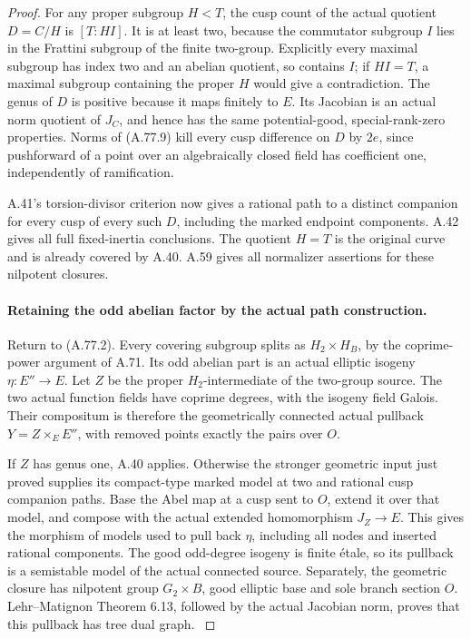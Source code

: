 \begin{proof}
For any proper subgroup \(H<T\), the cusp count of
the actual quotient \(D=C/H\) is \([T:HI]\).
It is at least two, because the commutator subgroup
\(I\) lies in the Frattini subgroup of the finite
two-group. Explicitly every maximal subgroup has index
two and an abelian quotient, so contains \(I\);
if \(HI=T\), a maximal subgroup containing the
proper \(H\) would give a contradiction. The genus
of \(D\) is positive because it maps finitely to
\(E\). Its Jacobian is an actual norm quotient of
\(J_C\), and hence has the same potential-good,
special-rank-zero properties. Norms of (A.77.9) kill
every cusp difference on \(D\) by \(2e\), since
pushforward of a point over an algebraically closed
field has coefficient one, independently of ramification.

A.41's torsion-divisor criterion now gives a rational
path to a distinct companion for every cusp of every
such \(D\), including the marked endpoint components.
A.42 gives all full fixed-inertia conclusions. The
quotient \(H=T\) is the original curve and is already
covered by A.40. A.59 gives all normalizer assertions
for these nilpotent closures.

\paragraph{Retaining the odd abelian factor by the actual path construction.}
Return to (A.77.2). Every covering subgroup splits as
\(H_2\times H_B\), by the coprime-power argument of
A.71. Its odd abelian part is an actual elliptic
isogeny \(\eta:E''\to E\). Let \(Z\) be the
proper \(H_2\)-intermediate of the two-group source.
The two actual function fields have coprime degrees,
with the isogeny field Galois. Their compositum is
therefore the geometrically connected actual pullback
\(Y=Z\times_EE''\), with removed points exactly
the pairs over \(O\).

If \(Z\) has genus one, A.40 applies. Otherwise the
stronger geometric input just proved supplies its
compact-type marked model at two and rational cusp
companion paths. Base the Abel map at a cusp sent
to \(O\), extend it over that model, and compose
with the actual extended homomorphism \(J_Z\to E\).
This gives the morphism of models used to pull back
\(\eta\), including all nodes and inserted rational
components.
\cite[Theorem 1.1 and Proposition 3.2]{fghDupuyRabinoff}
The good odd-degree isogeny is finite \'{e}tale, so
its pullback is a semistable model of the actual
connected source. Separately, the geometric closure
has nilpotent group \(G_2\times B\), good elliptic
base and sole branch section \(O\). Lehr--Matignon
Theorem 6.13, followed by the actual Jacobian norm,
proves that this pullback has tree dual graph.
\cite[Theorem 6.13]{fghLehrMatignon2005}


\end{proof}
